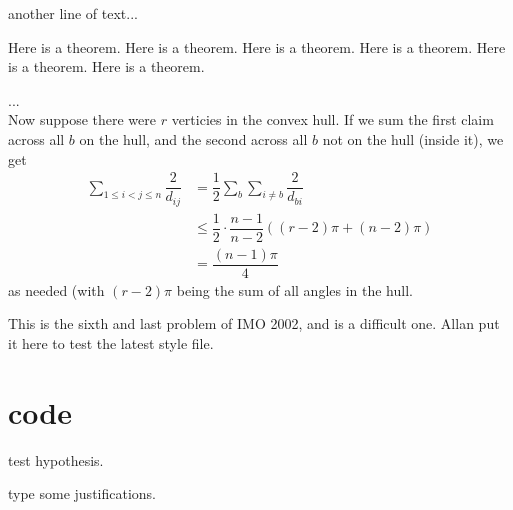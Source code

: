 \documentclass{article}
\begin{document}
        another line of text...
        \begin{allantheorem}
            Here is a theorem. Here is a theorem. Here is a theorem. Here is a theorem. Here is a theorem. Here is a theorem.
        \end{allantheorem}
        ...
        \\
        Now suppose there were \(r\) verticies in the convex hull. If we sum the first claim across all \(b\) on the hull, and the second across all \(b\) not on the hull (inside it), we get
        $$
        \begin{aligned}
            \sum\limits_{1\leq i< j\leq n} \dfrac{2}{d_{ij}}
            &= \dfrac{1}{2} \sum\limits_{b} \sum\limits_{i\neq b} \dfrac{2}{d_{bi}}
            \\
            &\leq \dfrac{1}{2}\cdot\dfrac{n-1}{n-2} ((r-2)\pi + (n-2)\pi)
            \\
            &= \dfrac{(n-1)\pi}{4}
        \end{aligned}
        $$
        as needed (with \((r-2)\pi\) being the sum of all angles in the hull.

        \begin{allanenvremark}
            This is the sixth and last problem of IMO 2002, and is a difficult one. Allan put it here to test the latest style file.
        \end{allanenvremark}

    \section{code}
        \begin{allanenvhypothesis}
            test hypothesis.
        \end{allanenvhypothesis}
        type some justifications.
\end{document}
